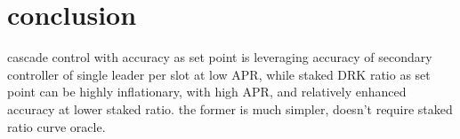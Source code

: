 \documentclass{article}
\begin{document}
\section{conclusion}
cascade control with accuracy as set point is leveraging accuracy of secondary controller of single leader per slot at low APR, while staked DRK ratio as set point can be highly inflationary, with high APR, and relatively enhanced accuracy at lower staked ratio. the former is much simpler, doesn't require staked ratio curve oracle.
\end{document}
